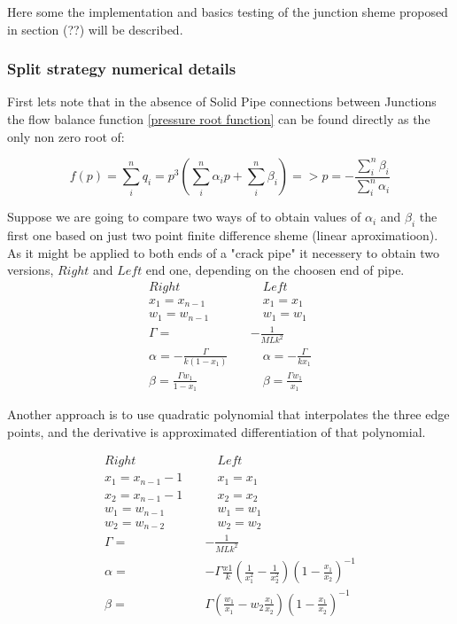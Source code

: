 Here some the implementation and basics testing of the junction sheme proposed in section (??) will be described.

\subsubsection{Split strategy numerical details}

First lets note that in the absence of Solid Pipe connections between Junctions the flow balance function \eqref{pressure root function} can be found directly as the only non zero root of:

\begin{equation}
	\label{pressure root simple}
	f(p)=\sum_i^n q_i=p^3 \left( \sum_i^n \alpha_i p+ \sum_i^n \beta_i  \right) => p=-\frac{ \sum_i^n \beta_i }{\sum_i^n \alpha_i}
\end{equation}


Suppose we are going to compare two ways of to obtain values of $\alpha_i$ and $\beta_i$ the first one based on just two point finite difference sheme (linear aproximatioon). As it might be applied to both ends of a "crack pipe" it necessery to obtain two versions, $Right$ and $Left$ end one, depending on the choosen end of pipe.
\begin{align}
	\label{junction linear}
		Right  \quad & \quad Left
		\\
		x_1=x_{n-1} \quad & \quad x_1=x_1
\\
		w_1=w_{n-1} \quad & \quad w_1=w_1
\\
		\Gamma=&-\frac{1}{MLk^2}
\\
		\alpha=-\frac{\Gamma}{k(1-x_1)} \quad & \quad \alpha=-\frac{\Gamma}{kx_1}
\\
		\beta=\frac{\Gamma w_1}{1-x_1} \quad & \quad \beta=\frac{\Gamma w_1}{x_1}
\end{align}

Another approach is to use quadratic polynomial that interpolates the three edge points, and the derivative is approximated differentiation of that polynomial.

\begin{align}
	\label{junction quadratic}
		Right  \quad & \quad Left
		\\
		x_1=x_{n-1}-1 \quad & \quad x_1=x_1
\\
		x_2=x_{n-1}-1 \quad & \quad x_2=x_2
\\
		w_1=w_{n-1} \quad & \quad w_1=w_1
\\
		w_2=w_{n-2} \quad & \quad w_2=w_2
\\
		\Gamma=&-\frac{1}{MLk^2}
\\
		\alpha=&-\Gamma \frac{x1}{k}\left(\frac{1}{x_1^2}-\frac{1}{x_2^2}\right)\left(1-\frac{x_1}{x_2}\right)^{-1}
\\
		\beta=&\Gamma\left (\frac{w_1}{x_1}-w_2\frac{x_1}{x_2}\right) \left(1-\frac{x_1}{x_2}\right)^{-1}
\end{align}

